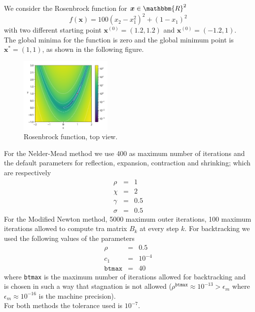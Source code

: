 
We consider the Rosenbrock function for $\boldsymbol{x} \in \mathbbm{R}^2$
\begin{equation*}
    f(\boldsymbol{x})=100(x_2-x_1^2)^2+(1-x_1)^2
\end{equation*}
with two different starting point $\boldsymbol{x}^{(0)}=(1.2,1.2)$ and $\boldsymbol{x}^{(0)}=(-1.2,1)$.
\\
The global minima for the function is zero and the global minimum
point is $\boldsymbol{x^*}=(1,1)$, as shown in the following figure.

\begin{figure}[H]
    \centering
    \includegraphics[width=0.4\textwidth]{img/es2_function.png}
    \caption{Rosenbrock function, top view.} 
    \label{pb 2 graph}
\end{figure}

For the Nelder-Mead method we use 400 as maximum number of iterations and the default parameters 
for reflection, expansion, contraction and shrinking; which are respectively
\begin{eqnarray*}
    \rho &=& 1 \\
    \chi &=& 2 \\
    \gamma &=& 0.5 \\
    \sigma &=& 0.5
\end{eqnarray*}
For the Modified Newton method, 5000 maximum outer iterations, 100 maximum iterations allowed to 
compute tra matrix $B_k$ at every step $k$. For backtracking we used the following values of the parameters 
\begin{eqnarray*}
    \rho &=& 0.5 \\
    c_1 &=& 10^{-4} \\
    \texttt{btmax} &=& 40
\end{eqnarray*}
where \texttt{btmax} is the maximum number of iterations allowed for backtracking and is chosen 
in such a way that stagnation is not allowed ($\rho^{\texttt{btmax}}\approx 10^{-13}>\epsilon_m$ 
where $\epsilon_m \approx 10^{-16}$ is the machine precision).
\\
For both methods the tolerance used is $10^{-7}$.

